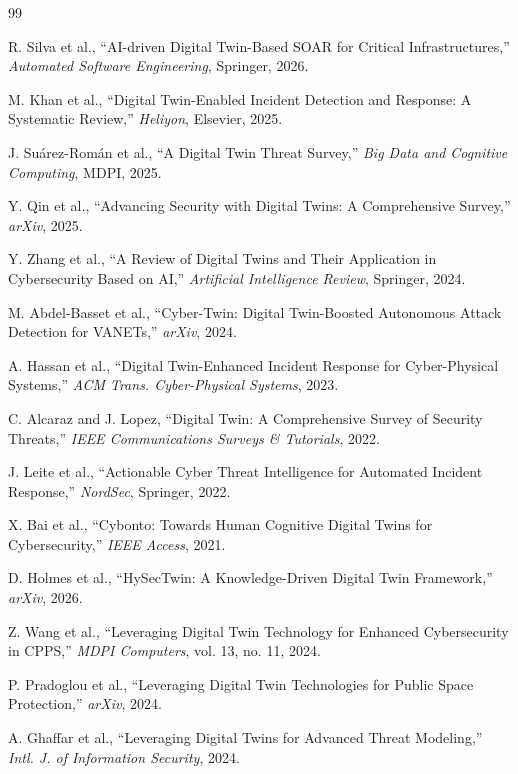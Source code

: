 \documentclass[12pt,a4paper]{amritareport}
\begin{document}
\begin{thebibliography}{99}

R. Silva et al., ``AI-driven Digital Twin-Based SOAR for Critical Infrastructures,'' \textit{Automated Software Engineering}, Springer, 2026.

M. Khan et al., ``Digital Twin-Enabled Incident Detection and Response: A Systematic Review,'' \textit{Heliyon}, Elsevier, 2025.

J. Su\'arez-Rom\'an et al., ``A Digital Twin Threat Survey,'' \textit{Big Data and Cognitive Computing}, MDPI, 2025.

Y. Qin et al., ``Advancing Security with Digital Twins: A Comprehensive Survey,'' \textit{arXiv}, 2025.

Y. Zhang et al., ``A Review of Digital Twins and Their Application in Cybersecurity Based on AI,'' \textit{Artificial Intelligence Review}, Springer, 2024.

M. Abdel-Basset et al., ``Cyber-Twin: Digital Twin-Boosted Autonomous Attack Detection for VANETs,'' \textit{arXiv}, 2024.

A. Hassan et al., ``Digital Twin-Enhanced Incident Response for Cyber-Physical Systems,'' \textit{ACM Trans. Cyber-Physical Systems}, 2023.

C. Alcaraz and J. Lopez, ``Digital Twin: A Comprehensive Survey of Security Threats,'' \textit{IEEE Communications Surveys \& Tutorials}, 2022.

J. Leite et al., ``Actionable Cyber Threat Intelligence for Automated Incident Response,'' \textit{NordSec}, Springer, 2022.

X. Bai et al., ``Cybonto: Towards Human Cognitive Digital Twins for Cybersecurity,'' \textit{IEEE Access}, 2021.

D. Holmes et al., ``HySecTwin: A Knowledge-Driven Digital Twin Framework,'' \textit{arXiv}, 2026.

Z. Wang et al., ``Leveraging Digital Twin Technology for Enhanced Cybersecurity in CPPS,'' \textit{MDPI Computers}, vol. 13, no. 11, 2024.

P. Pradoglou et al., ``Leveraging Digital Twin Technologies for Public Space Protection,'' \textit{arXiv}, 2024.

A. Ghaffar et al., ``Leveraging Digital Twins for Advanced Threat Modeling,'' \textit{Intl. J. of Information Security}, 2024.


\end{thebibliography}
\end{document}
